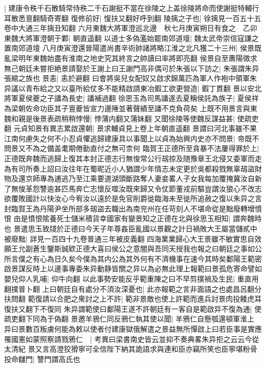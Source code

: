 |{
	建康令秩千石散騎常侍秩二千石謝挺不當在徐陵之上盖徐陵將命而使謝挺特輔行耳散悉亶翻騎奇寄翻}
復修前好|{
	愎扶又翻好呼到翻}
陵摛之子也|{
	徐摛見一百五十五卷中大通三年摛丑知翻}
六月東魏大將軍澄巡北邊　秋七月庚寅朔日有食之　乙卯東魏大將軍澄朝于鄴|{
	朝直遥翻}
以道士多偽濫始罷南郊道壇|{
	魏太武帝崇信寇謙之置南郊道壇}
八月庚寅澄還晉陽遣尚書辛術帥諸將略江淮之北凡獲二十三州|{
	侯景既亂梁明年東魏始盡有淮南之地史究其終言之帥讀曰率將即亮翻}
侯景自至夀陽徵求無己朝廷未嘗拒絶景請娶於王謝上曰王謝門高非偶可於朱張以下訪之|{
	朱張謂朱异張綰之族也}
景恚|{
	恚於避翻}
曰會將吳兒女配奴又啟求錦萬匹為軍人作袍中領軍朱异議以青布給之又以臺所給仗多不能精啟請東冶鍜工欲更營造|{
	鍜丁貫翻}
景以安北將軍夏侯夔之子譒為長史|{
	譒補過翻}
徐思玉為司馬譒遂去夏稱侯託為族子|{
	夏侯祥為梁朝佐命功臣其子亶夔皆宣力邊陲並著聲績至譒不克負荷矣}
上既不用景言與東魏和親是後景表疏稍稍悖慢|{
	悖蒲内翻又蒲妹翻}
又聞徐陵等使魏反謀益甚|{
	使疏吏翻}
元貞知景有異志累啟還朝|{
	景求輔貞見上卷上年朝直遥翻}
景謂曰河北事雖不果江南何慮失之何不小忍貞懼逃歸建康具以事聞上以貞為始興内史亦不問景|{
	帝既不問景又不為之備盖耄期倦勤直付之無可柰何}
臨賀王正德所至貪暴不法屢得罪於上|{
	正德既奔魏而逃歸上復其本封正德志行無悛常公行刼掠及随豫章王北侵又委軍而走為有司所奏上詔曰汝往年在蜀昵近小人猶謂少年情志未定更於吳都殺戮無辜刼盜財物及還京師專為逋逃乃至江乘要道湖頭斷路奪人妻妾畧人子女我每加覆掩冀汝自新了無悛革怨讐逾甚匹馬奔亡志懷反噬汝既來歸又令仗節董戎前驅豈謂汝狼心不改志欲覆敗國計以快汝心今宥汝以遠於是免官削爵徙臨海未至徙所追赦之復以朱异之言封臨賀王為丹陽尹坐所部多刼盜去職出為南兖州在任苛刻人不堪命從是黜廢轉增憤恨}
由是憤恨隂養死士儲米積貨幸國家有變景知之正德在北與徐思玉相知|{
	謂奔魏時也}
景遣思玉致牋於正德曰今天子年尊姦臣亂國以景觀之計日禍敗大王屬當儲貳中被廢黜|{
	詳見一百四十九卷普通三年被皮義翻}
四海業業歸心大王景雖不敏實思自效願王允副蒼生鑒斯誠欵正德大喜曰侯公之意闇與吾同天授我也報之曰朝廷之事如公所言僕之有心為日久矣今僕為其内公為其外何有不濟機事在速今其時矣鄱陽王範密啟景謀反時上以邊事專委朱异動静皆關之异以為必無此理上報範曰景孤危寄命譬如嬰兒仰人乳哺|{
	仰牛向翻}
以此事勢安能反乎範重陳之曰不早剪撲禍及生民|{
	重直用翻撲普卜翻}
上曰朝廷自有處分不須汝深憂也|{
	此亦報範之言非面語之也處昌呂翻分扶問翻}
範復請以合肥之衆討之上不許|{
	範非景敵也使上許範而進兵討景肉投餧虎耳復扶又翻下不復同}
朱异謂範使曰鄱陽王遂不許朝廷有一客自是範啟异不復為通|{
	使疏吏翻下同為于偽翻}
景邀羊鴉仁同反鴉仁執其使以聞|{
	羊鴉仁自懸瓠還頓軍淮上}
异曰景數百叛虜何能為敕以使者付建康獄俄解遣之景益無所憚啟上曰若臣事是實應罹國憲如蒙照察請戮鴉仁　|{
	考異曰梁書南史皆云並抑不奏典畧朱异拒之云云今從太清紀}
景又言高澄狡猾寧可全信陛下納其詭語求與連和臣亦竊所笑也臣寧堪粉骨投命讎門|{
	讐門謂高氏也}
